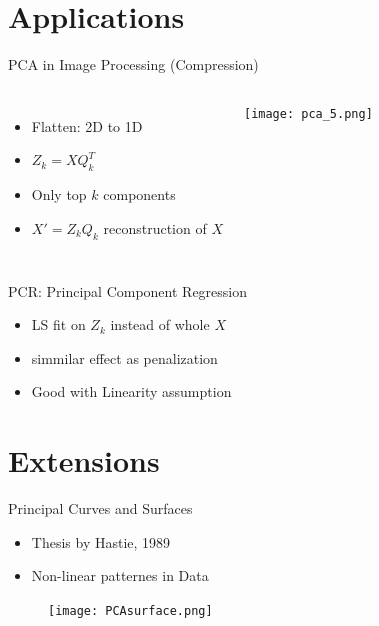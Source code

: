 \documentclass{beamer}
\begin{document}
\section{Applications}
\begin{frame}{PCA in Image Processing (Compression)}
    \begin{columns}
        \begin{itemize}
            \item Flatten: 2D to 1D
            \item \(Z_k = XQ_k^T\)
            \item Only top $k$ components
            \item \(X' = Z_k Q_k \) reconstruction of \(X\)
        \end{itemize}
        \texttt{[image: pca\_5.png]}
    \end{columns}
\end{frame}

\begin{frame}{PCR: Principal Component Regression}
    \begin{itemize}
        \item LS fit on \(Z_k\) instead of whole \(X\) \cite{hastie2009}
        \item simmilar effect as penalization
        \item Good with Linearity assumption
    \end{itemize}
\end{frame}

\section{Extensions}
\begin{frame}{Principal Curves and Surfaces}
    \begin{itemize}
        \item Thesis by Hastie, 1989 \cite{Hastie01061989}
        \item Non-linear patternes in Data
    \end{itemize}
    \begin{figure}
        \texttt{[image: PCAsurface.png]}
    \end{figure}
\end{frame}
\end{document}
